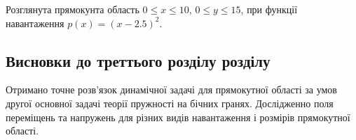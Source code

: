 Розглянута прямокунта область $0 \le x \le 10$, $0 \le y \le 15$, при функції навантаження $p(x)=(x-2.5)^2$.

\subsection{Висновки до треттього розділу розділу}
Отримано точне розв'язок динамічної задачі для прямокутної області за умов другої основної задачі теорії пружності на бічних гранях.
Дослідженно поля переміщень та напружень для різних видів навантаження і розмірів прямокутної області.
